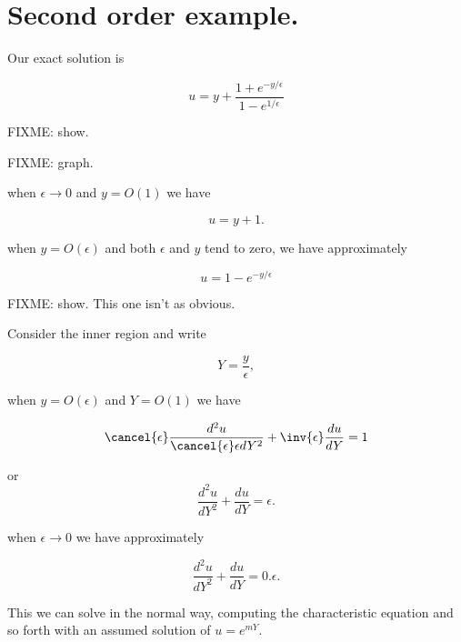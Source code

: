 \section{Second order example.}

Our exact solution is

\begin{equation}\label{eqn:continuumL20:310}
u = y + \frac{1 + e^{-y/\epsilon}}{1 - e^{1/\epsilon}}
\end{equation}

FIXME: show.

FIXME: graph.

when $\epsilon \rightarrow 0$ and $y = O(1)$ we have

\begin{equation}\label{eqn:continuumL20:330}
u = y + 1.
\end{equation}

when $y = O(\epsilon)$ and both $\epsilon$ and $y$ tend to zero, we have approximately

\begin{equation}\label{eqn:continuumL20:350}
u = 1 - e^{-y/\epsilon}
\end{equation}

FIXME: show.  This one isn't as obvious.

Consider the inner region and write

\begin{equation}\label{eqn:continuumL20:n}
Y = \frac{y}{\epsilon},
\end{equation}

when $y = O(\epsilon)$ and $Y = O(1)$ we have

\begin{equation}\label{eqn:continuumL20:n}
\cancel{\epsilon} \frac{d^2 u}{\cancel{\epsilon} \epsilon dY^2} + \inv{\epsilon} \frac{du}{dY} = 1
\end{equation}

or
\begin{equation}\label{eqn:continuumL20:n}
\frac{d^2 u}{dY^2} + \frac{du}{dY} = \epsilon.
\end{equation}

when $\epsilon \rightarrow 0$ we have approximately

\begin{equation}\label{eqn:continuumL20:n}
\frac{d^2 u}{dY^2} + \frac{du}{dY} = 0.
\epsilon.
\end{equation}

This we can solve in the normal way, computing the characteristic equation and so forth with an assumed solution of $u = e^{mY}$.

